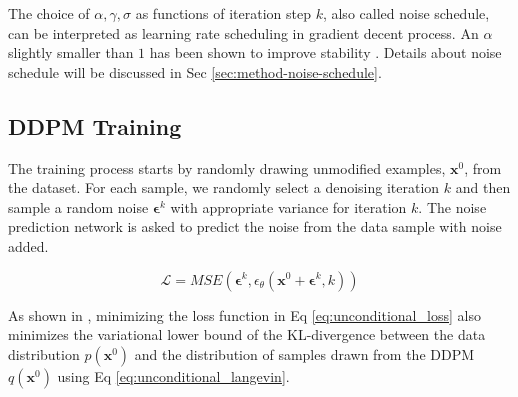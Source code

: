 The choice of $\alpha,\gamma,\sigma$ as functions of iteration step $k$, also called noise schedule, can be interpreted as learning rate scheduling in gradient decent process. 
An $\alpha$ slightly smaller than $1$ has been shown to improve stability \cite{ho2020denoising}.
Details about noise schedule will be discussed in Sec \ref{sec:method-noise-schedule}.


\subsection{DDPM Training} 
\label{sec:ddpm_inference}


The training process starts by randomly drawing unmodified examples, $\mathbf{x}^0$, from the dataset. For each sample, we randomly select a denoising iteration $k$ and then sample a random noise $\mathbf{\epsilon}^k$ with appropriate variance for iteration $k$. The noise prediction network is asked to predict the noise from the data sample with noise added.

\vspace{-2mm}
\begin{equation}
    \mathcal{L} = MSE(\mathbf{\epsilon}^k, \epsilon_\theta(\mathbf{x}^0+\mathbf{\epsilon}^k,k))
    \label{eq:unconditional_loss}
\end{equation}

As shown in \cite{ho2020denoising}, minimizing the loss function in Eq \ref{eq:unconditional_loss} also minimizes the variational lower bound of the KL-divergence between the data distribution $p(\mathbf{x}^0)$ and the distribution of samples drawn from the DDPM $q(\mathbf{x}^0)$ using Eq \ref{eq:unconditional_langevin}.

